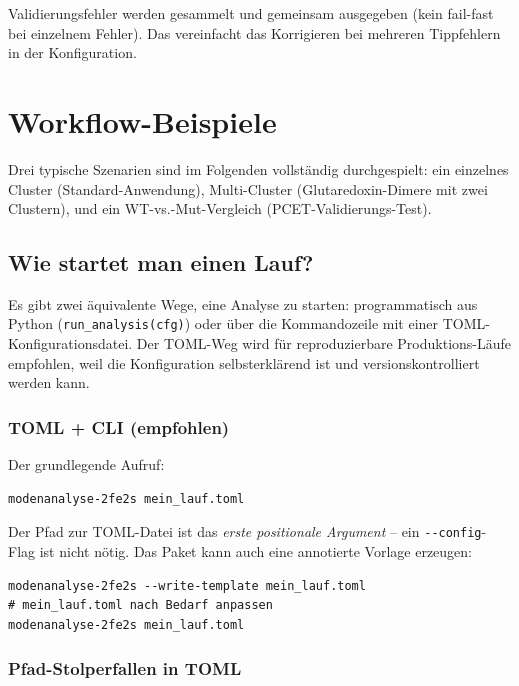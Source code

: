 \documentclass[11pt,a4paper,twoside]{article}
\theoremstyle{remark}
\begin{document}
Validierungsfehler werden gesammelt und gemeinsam ausgegeben (kein
fail-fast bei einzelnem Fehler). Das vereinfacht das Korrigieren bei
mehreren Tippfehlern in der Konfiguration.

\section{Workflow-Beispiele}
\label{sec:workflow}

Drei typische Szenarien sind im Folgenden vollst\"andig durchgespielt:
ein einzelnes Cluster (Standard-Anwendung), Multi-Cluster (Glutaredoxin-Dimere mit zwei
Clustern), und ein WT-vs.-Mut-Vergleich (PCET-Validierungs-Test).

\subsection{Wie startet man einen Lauf?}
\label{sec:workflow-how-to-start}

Es gibt zwei \"aquivalente Wege, eine Analyse zu starten:
programmatisch aus Python (\texttt{run\_analysis(cfg)}) oder \"uber
die Kommandozeile mit einer TOML-Konfigurationsdatei. Der TOML-Weg
wird f\"ur reproduzierbare Produktions-L\"aufe empfohlen, weil die
Konfiguration selbsterkl\"arend ist und versionskontrolliert werden
kann.

\subsubsection*{TOML + CLI (empfohlen)}

Der grundlegende Aufruf:

\begin{lstlisting}[style=bash]
modenanalyse-2fe2s mein_lauf.toml
\end{lstlisting}

Der Pfad zur TOML-Datei ist das \emph{erste positionale Argument}
-- ein \texttt{-{}-config}-Flag ist nicht n\"otig. Das Paket kann
auch eine annotierte Vorlage erzeugen:

\begin{lstlisting}[style=bash]
modenanalyse-2fe2s --write-template mein_lauf.toml
# mein_lauf.toml nach Bedarf anpassen
modenanalyse-2fe2s mein_lauf.toml
\end{lstlisting}

\subsubsection*{Pfad-Stolperfallen in TOML}
\end{document}

